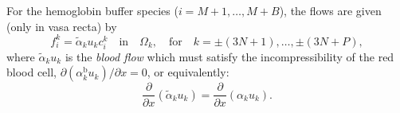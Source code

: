 \documentclass{article}
\begin{document}
For the hemoglobin buffer species ($i=M+1,\dots,M+B$), the flows are given (only in vasa recta) by
\begin{equation}
    f_i^k = \tilde{\alpha}_ku_kc_i^k
        \quad\text{in}\quad \Omega_k,\quad\text{for}\quad k=\pm(3N+1),\dots,\pm(3N+P),
\end{equation}
where $\tilde{\alpha}_ku_k$ is the \textit{blood flow} which must satisfy the incompressibility of the red blood cell, $\partial (\alpha^\mathrm{b}_k u_k)/\partial x = 0$, or equivalently:
\begin{equation}
    \frac{\partial}{\partial x}\left( \tilde{\alpha}_k u_k\right) = \frac{\partial}{\partial x}\left( \alpha_k u_k \right).
\end{equation}
    
\end{document}
